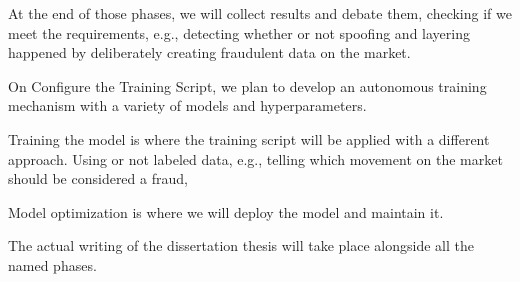 At the end of those phases, we will collect results and debate them, checking if we meet the requirements, e.g., detecting whether or not spoofing and layering happened by deliberately creating fraudulent data on the market.

On Configure the Training Script, we plan to develop an autonomous training mechanism with a variety of models and hyperparameters.

Training the model is where the training script will be applied with a different approach. Using or not labeled data, e.g., telling which movement on the market should be considered a fraud,

Model optimization is where we will deploy the model and maintain it.

The actual writing of the dissertation thesis will take place alongside all the named phases.